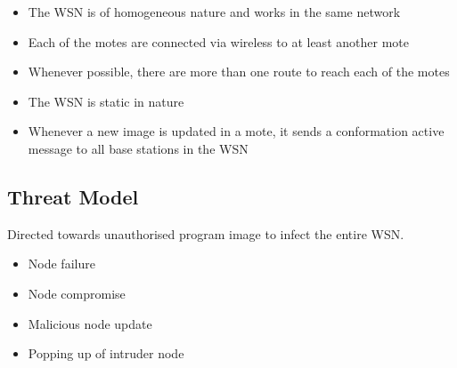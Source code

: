 \documentclass[conference,final]{IEEEtran}
\begin{document}
\begin{itemize}
	\item	The WSN is of homogeneous nature and works in the same network
	\item	Each of the motes are  connected via wireless to at least another mote
	\item	Whenever possible, there are more than one route to reach each of the motes
	\item	The WSN is static in nature
	\item	Whenever a new image is updated in a mote, it sends a conformation active message to all base stations in the WSN
\end{itemize}

\subsection{Threat Model}


Directed towards unauthorised program image to infect the entire WSN.
\begin{itemize}
\item Node failure
\item Node compromise
\item Malicious node update
\item Popping up of intruder node
\end{itemize}





%    
%
%
%
\end{document}
